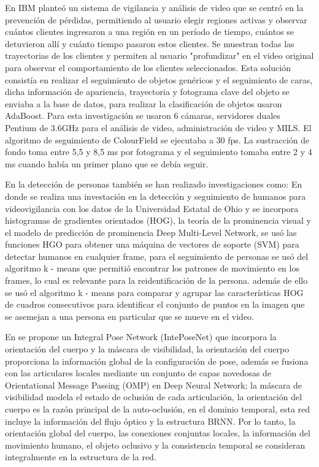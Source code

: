 \documentclass[conference]{IEEEtran}
\begin{document}
En \cite{senior2007video} IBM planteó un sistema de vigilancia y análisis de video que se centró en la prevención de pérdidas, permitiendo al usuario elegir regiones activas y observar cuántos clientes ingresaron a una región en un período de tiempo, cuántos se detuvieron allí y cuánto tiempo pasaron estos clientes. Se muestran todas las trayectorias de los clientes y permiten al usuario "profundizar" en el video original para observar el comportamiento de los clientes seleccionados. Esta solución consistía en realizar el seguimiento de objetos genéricos y el seguimiento de caras, dicha información de apariencia, trayectoria y fotograma clave del objeto se enviaba a la base de datos, para realizar la clasificación de objetos usaron AdaBoost. Para esta investigación se usaron 6 cámaras, servidores duales Pentium de 3.6GHz para el análisis de video, administración de video y MILS. El algoritmo de seguimiento de ColourField se ejecutaba a 30 fps. La sustracción de fondo toma entre 5,5 y 8,5 ms por fotograma y el seguimiento tomaba entre 2 y 4 ms cuando había un primer plano que se debía seguir.

En la detección de personas también se han realizado investigaciones como:
En \cite{gajjar2017human} donde se realiza una investación en la detección y seguimiento de humanos para videovigilancia con los datos de la Universidad Estatal de Ohio y se incorpora histogramas de gradientes orientados (HOG), la teoría de la prominencia visual y el modelo de predicción de prominencia Deep Multi-Level Network, se usó las funciones HGO para obtener una máquina de vectores de soporte (SVM) para detectar humanos en cualquier frame, para el seguimiento de personas se usó del algoritmo k - means que permitió encontrar los patrones de movimiento en los frames, lo cual es relevante para la reidentificación de la persona. además de ello se usó el algoritmo k - means para comparar y agrupar las características HOG de cuadros consecutivos para identificar el conjunto de puntos en la imagen que se asemejan a una persona en particular que se mueve en el video.

En \cite{liu2018integral} se propone un Integral Pose Network (IntePoseNet) que incorpora la orientación del cuerpo y la máscara de visibilidad, la orientación del cuerpo proporciona la información global de la configuración de pose, además se fusiona con las articulares locales mediante un conjunto de capas novedosas de Orientational Message Passing (OMP) en Deep Neural Network; la máscara de visibilidad modela el estado de oclusión de cada articulación, la orientación del cuerpo es la razón principal de la auto-oclusión, en el dominio temporal, esta red incluye la información del flujo óptico y la estructura BRNN. Por lo tanto, la orientación global del cuerpo, las conexiones conjuntas locales, la información del movimiento humano, el objeto oclusivo y la consistencia temporal se consideran integralmente en la estructura de la red.
\end{document}
